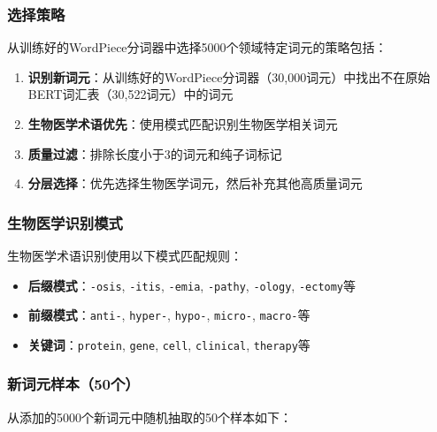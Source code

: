\documentclass[12pt,letterpaper]{article}
\begin{document}
\subsubsection{选择策略}

从训练好的WordPiece分词器中选择5000个领域特定词元的策略包括：

\begin{enumerate}
    \item \textbf{识别新词元}：从训练好的WordPiece分词器（30,000词元）中找出不在原始BERT词汇表（30,522词元）中的词元
    \item \textbf{生物医学术语优先}：使用模式匹配识别生物医学相关词元
    \item \textbf{质量过滤}：排除长度小于3的词元和纯子词标记
    \item \textbf{分层选择}：优先选择生物医学词元，然后补充其他高质量词元
\end{enumerate}

\subsubsection{生物医学识别模式}

生物医学术语识别使用以下模式匹配规则：

\begin{itemize}
    \item \textbf{后缀模式}：\texttt{-osis}, \texttt{-itis}, \texttt{-emia}, \texttt{-pathy}, \texttt{-ology}, \texttt{-ectomy}等
    \item \textbf{前缀模式}：\texttt{anti-}, \texttt{hyper-}, \texttt{hypo-}, \texttt{micro-}, \texttt{macro-}等  
    \item \textbf{关键词}：\texttt{protein}, \texttt{gene}, \texttt{cell}, \texttt{clinical}, \texttt{therapy}等
\end{itemize}

\subsubsection{新词元样本（50个）}

从添加的5000个新词元中随机抽取的50个样本如下：
\end{document}
